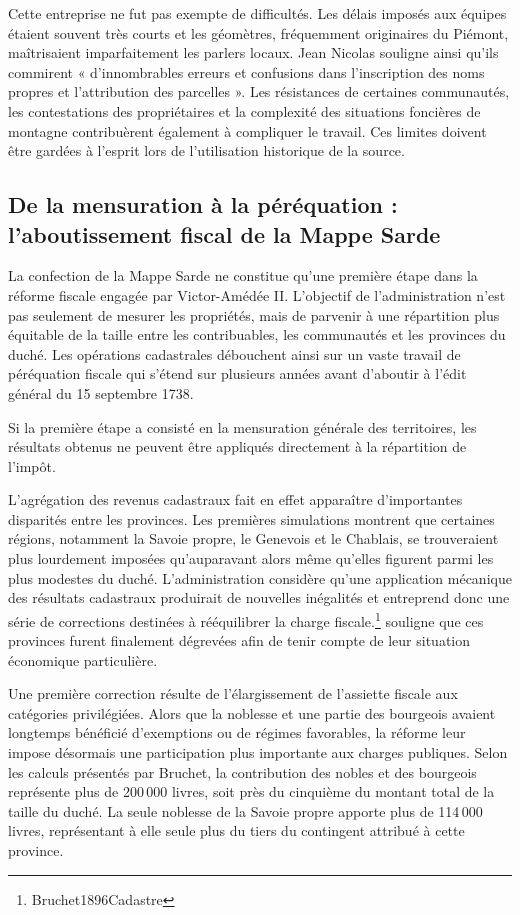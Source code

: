 \documentclass[12pt,a4paper]{report}
\begin{document}
Cette entreprise ne fut pas exempte de difficultés. Les délais imposés aux équipes étaient souvent très courts et les géomètres, fréquemment originaires du Piémont, maîtrisaient imparfaitement les parlers locaux. Jean Nicolas souligne ainsi qu'ils commirent « d'innombrables erreurs et confusions dans l'inscription des noms propres et l'attribution des parcelles ». Les résistances de certaines communautés, les contestations des propriétaires et la complexité des situations foncières de montagne contribuèrent également à compliquer le travail. Ces limites doivent être gardées à l'esprit lors de l'utilisation historique de la source.

\subsection{De la mensuration à la péréquation : l'aboutissement fiscal de la Mappe Sarde}

La confection de la Mappe Sarde ne constitue qu'une première étape dans la réforme fiscale engagée par Victor-Amédée II. L'objectif de l'administration n'est pas seulement de mesurer les propriétés, mais de parvenir à une répartition plus équitable de la taille entre les contribuables, les communautés et les provinces du duché. Les opérations cadastrales débouchent ainsi sur un vaste travail de péréquation fiscale qui s'étend sur plusieurs années avant d'aboutir à l'édit général du 15 septembre 1738.

Si la première étape a consisté en la mensuration générale des territoires, les résultats obtenus ne peuvent être appliqués directement à la répartition de l'impôt.

L'agrégation des revenus cadastraux fait en effet apparaître d'importantes disparités entre les provinces. Les premières simulations montrent que certaines régions, notamment la Savoie propre, le Genevois et le Chablais, se trouveraient plus lourdement imposées qu'auparavant alors même qu'elles figurent parmi les plus modestes du duché. L'administration considère qu'une application mécanique des résultats cadastraux produirait de nouvelles inégalités et entreprend donc une série de corrections destinées à rééquilibrer la charge fiscale.\footnote{Bruchet1896Cadastre} souligne que ces provinces furent finalement dégrevées afin de tenir compte de leur situation économique particulière.

Une première correction résulte de l'élargissement de l'assiette fiscale aux catégories privilégiées. Alors que la noblesse et une partie des bourgeois avaient longtemps bénéficié d'exemptions ou de régimes favorables, la réforme leur impose désormais une participation plus importante aux charges publiques. Selon les calculs présentés par Bruchet, la contribution des nobles et des bourgeois représente plus de 200\,000 livres, soit près du cinquième du montant total de la taille du duché. La seule noblesse de la Savoie propre apporte plus de 114\,000 livres, représentant à elle seule plus du tiers du contingent attribué à cette province.
\end{document}
